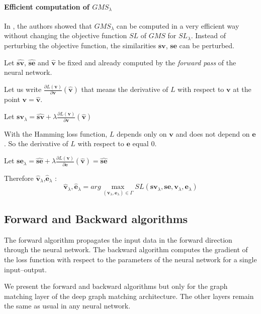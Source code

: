 \documentclass[times,onecolumn,final,authoryear]{article}
\theoremstyle{definition}
\begin{document}
\paragraph{Efficient computation of $GMS_\lambda$}
 In \cite{DBLP:journals/corr/abs-1912-02175}, the authors showed that $GMS_\lambda$ can be computed in a very efficient way without changing the objective function $SL$ of $GMS$ for $SL_\lambda$. Instead of perturbing the objective function, the similarities $\textbf{sv}$, $\textbf{se}$ can be perturbed.
 

Let $\hat{\textbf{sv}}$, $\hat{\textbf{se}}$ and $\hat{\textbf{v}}$ be fixed and already computed by the \textit{forward pass} of the neural network.

Let us write $\frac{\partial L(\textbf{v})}{\partial \textbf{v}}(\hat{\textbf{v}})$ that means the derivative of $L$ with respect to $\textbf{v}$ at the point  $\textbf{v}=\hat{\textbf{v}}$.


Let $\textbf{sv}_\lambda=\hat{\textbf{sv}}+\lambda \frac{\partial L(\textbf{v})}{\partial \textbf{v}}(\hat{\textbf{v}})$

With the Hamming loss function, $L$ depends only on $\textbf{v}$ and does not depend on $\textbf{e}$. So the derivative of $L$ with respect to $\textbf{e}$ equal 0.

Let $\textbf{se}_\lambda=\hat{\textbf{se}}+\lambda \frac{\partial L(\textbf{v})}{\partial \textbf{e}}(\hat{\textbf{v}})=\hat{\textbf{se}}$

Therefore $\hat{\textbf{v}}_\lambda$,$\hat{\textbf{e}}_\lambda$ :
\begin{equation}
\hat{\textbf{v}}_{\lambda},\hat{\textbf{e}}_{\lambda} = arg \max_{(\textbf{v}_{\lambda},\textbf{e}_{\lambda}) \in \Gamma} SL(\textbf{sv}_\lambda,\textbf{se},\textbf{v}_{\lambda},\textbf{e}_{\lambda}) 
\end{equation}


\subsection{Forward and Backward algorithms}

The forward algorithm propagates the input data in the forward direction through the neural network.
The backward algorithm computes the gradient of the loss function with respect to the parameters of the neural network for a single input–output.

We present the forward and backward algorithms but only for the graph matching layer of the deep graph matching architecture. The other layers remain the same as usual in any neural network.
\end{document}

